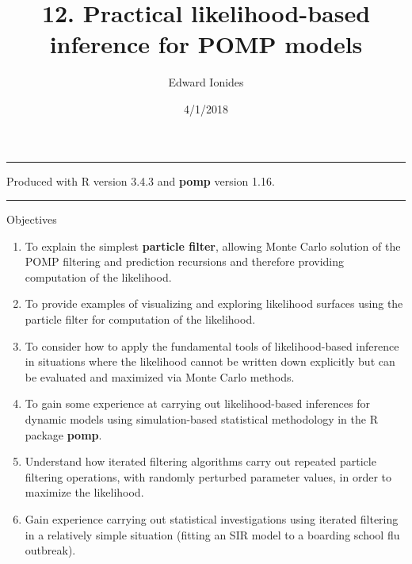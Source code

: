 \documentclass[]{article}
\title{12. Practical likelihood-based inference for POMP models}
\author{Edward Ionides}
\date{4/1/2018}
\begin{document}
\maketitle

{
\setcounter{tocdepth}{2}
\tableofcontents
}
\newcommand\prob{\mathbb{P}}
\newcommand\E{\mathbb{E}}
\newcommand\cov{\mathrm{Cov}}
\newcommand\loglik{\ell}
\newcommand\R{\mathbb{R}}
\newcommand\data[1]{#1^*}
\newcommand\params{\, ; \,}
\newcommand\transpose{\scriptsize{T}}
\newcommand\eqspace{\quad\quad}
\newcommand\myeq[1]{\eqspace \displaystyle #1}
\newcommand\lik{\mathcal{L}}
\newcommand\profileloglik[1]{\ell^\mathrm{profile}_#1}
\newcommand\ar{\phi}
\newcommand\ma{\psi}
\newcommand\AR{\Phi}
\newcommand\MA{\Psi}
\newcommand\ev{u}
\newcommand\given{{\, | \,}}
\newcommand\equals{{=\,}}
\newcommand\matA{\mathbb{A}}
\newcommand\matB{\mathbb{B}}
\newcommand\matH{\mathbb{H}}
\newcommand\covmatX{\mathbb{U}}
\newcommand\covmatY{\mathbb{V}}

\newcommand\expect[1]{\mathbb{E}\left[{#1}\right]}
\newcommand\var[1]{\mathrm{Var}\left[{#1}\right]}
\newcommand\dist[2]{\mathrm{#1}\left(#2\right)}
\newcommand\dlta{\Delta}

\begin{center}\rule{0.5\linewidth}{\linethickness}\end{center}

Produced with R version 3.4.3 and \textbf{pomp} version 1.16.

\begin{center}\rule{0.5\linewidth}{\linethickness}\end{center}

Objectives

\begin{enumerate}
\def\labelenumi{\arabic{enumi}.}
\item
  To explain the simplest \textbf{particle filter}, allowing Monte Carlo
  solution of the POMP filtering and prediction recursions and therefore
  providing computation of the likelihood.
\item
  To provide examples of visualizing and exploring likelihood surfaces
  using the particle filter for computation of the likelihood.
\item
  To consider how to apply the fundamental tools of likelihood-based
  inference in situations where the likelihood cannot be written down
  explicitly but can be evaluated and maximized via Monte Carlo methods.
\item
  To gain some experience at carrying out likelihood-based inferences
  for dynamic models using simulation-based statistical methodology in
  the R package \textbf{pomp}.
\item
  Understand how iterated filtering algorithms carry out repeated
  particle filtering operations, with randomly perturbed parameter
  values, in order to maximize the likelihood.
\item
  Gain experience carrying out statistical investigations using iterated
  filtering in a relatively simple situation (fitting an SIR model to a
  boarding school flu outbreak).
\end{enumerate}
\end{document}
